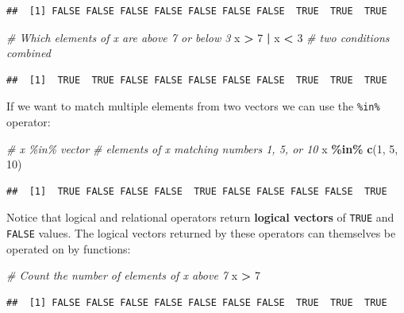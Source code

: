 \documentclass[
]{book}
\newenvironment{Shaded}{\begin{snugshade}}{\end{snugshade}}
\newcommand{\CommentTok}[1]{\textcolor[rgb]{0.56,0.35,0.01}{\textit{#1}}}
\newcommand{\DecValTok}[1]{\textcolor[rgb]{0.00,0.00,0.81}{#1}}
\newcommand{\KeywordTok}[1]{\textcolor[rgb]{0.13,0.29,0.53}{\textbf{#1}}}
\newcommand{\NormalTok}[1]{#1}
\newcommand{\OperatorTok}[1]{\textcolor[rgb]{0.81,0.36,0.00}{\textbf{#1}}}
\newcommand{\StringTok}[1]{\textcolor[rgb]{0.31,0.60,0.02}{#1}}
\begin{document}
\begin{verbatim}
##  [1] FALSE FALSE FALSE FALSE FALSE FALSE FALSE  TRUE  TRUE  TRUE
\end{verbatim}

\begin{Shaded}
\begin{Highlighting}[]
\CommentTok{\# Which elements of x are above 7 or below 3}
\NormalTok{x }\OperatorTok{\textgreater{}}\StringTok{ }\DecValTok{7} \OperatorTok{|}\StringTok{ }\NormalTok{x }\OperatorTok{\textless{}}\StringTok{ }\DecValTok{3} \CommentTok{\# two conditions combined}
\end{Highlighting}
\end{Shaded}

\begin{verbatim}
##  [1]  TRUE  TRUE FALSE FALSE FALSE FALSE FALSE  TRUE  TRUE  TRUE
\end{verbatim}

If we want to match multiple elements from two vectors we can use the \texttt{\%in\%} operator:

\begin{Shaded}
\begin{Highlighting}[]
\CommentTok{\# x \%in\% vector}
\CommentTok{\# elements of x matching numbers 1, 5, or 10 }
\NormalTok{x }\OperatorTok{\%in\%}\StringTok{ }\KeywordTok{c}\NormalTok{(}\DecValTok{1}\NormalTok{, }\DecValTok{5}\NormalTok{, }\DecValTok{10}\NormalTok{) }
\end{Highlighting}
\end{Shaded}

\begin{verbatim}
##  [1]  TRUE FALSE FALSE FALSE  TRUE FALSE FALSE FALSE FALSE  TRUE
\end{verbatim}

Notice that logical and relational operators return \textbf{logical vectors} of \texttt{TRUE} and \texttt{FALSE} values. The logical vectors returned by these operators can themselves be operated on by functions:

\begin{Shaded}
\begin{Highlighting}[]
\CommentTok{\# Count the number of elements of x above 7}
\NormalTok{x }\OperatorTok{\textgreater{}}\StringTok{ }\DecValTok{7}
\end{Highlighting}
\end{Shaded}

\begin{verbatim}
##  [1] FALSE FALSE FALSE FALSE FALSE FALSE FALSE  TRUE  TRUE  TRUE
\end{verbatim}
\end{document}
